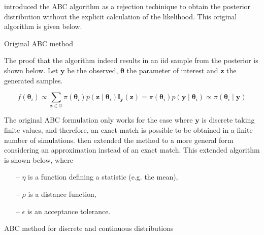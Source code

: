 \documentclass[runningheads]{llncs}
\begin{document}
\citet{Tavare505} introduced the ABC algorithm as a rejection
techinique to obtain the posterior distribution without the explicit
calculation of the likelihood. This original algorithm is given below.

\hfill\break
\begin{algorithm}[H]
\SetAlgoLined
{}
 \caption{Original ABC method}
\end{algorithm}
The proof that the algorithm indeed results in an iid sample
from the posterior is shown below. Let $\bm y$ be the observed,
$\bm \theta$ the parameter of interest and $\bm z$ the generated
samples.

\begin{equation}
  f(\bm \theta_i) \propto \sum_{\bm z \in \mathbb{D}}
  \pi(\bm \theta_i) p(\bm z \mid \bm \theta_i) \mathbb I_{\bm y}(\bm z)
  = \pi(\bm \theta_i) p(\bm y \mid \bm \theta_i) \propto
  \pi(\bm \theta_i \mid \bm y)
\end{equation}

The original ABC formulation only works for
the case where $\bm y$ is discrete
taking finite values, and therefore, an exact match is possible
to be obtained in a finite number of simulations. \citet{Pritchard1999}
then extended the method to a more general form considering an
approximation instead of an exact match. This extended algorithm is
shown below, where

\begin{itemize}
  \item[--] $\eta$ is a function defining a statistic (e.g. the mean),
  \item[--] $\rho$ is a distance function,
  \item[--] $\epsilon$ is an acceptance tolerance.
\end{itemize}

\hfill\break
\begin{algorithm}[H]
\SetAlgoLined
{}
 \caption{ABC method for discrete and continuous distributions}
\end{algorithm}
\hfill\break
\end{document}
